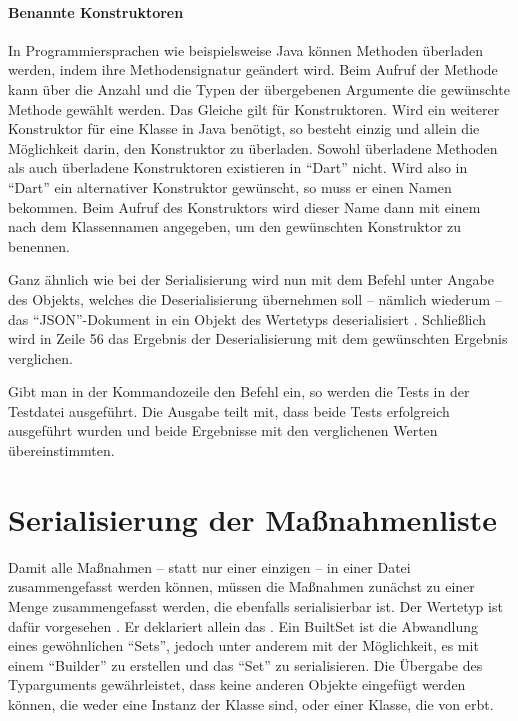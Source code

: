\paragraph{Benannte Konstruktoren} In Programmiersprachen wie beispielsweise Java können Methoden überladen werden, indem ihre Methodensignatur geändert wird.
Beim Aufruf der Methode kann über die Anzahl und die Typen der übergebenen Argumente die gewünschte Methode gewählt werden.
Das Gleiche gilt für Konstruktoren.
Wird ein weiterer Konstruktor für eine Klasse in Java benötigt, so besteht einzig und allein die Möglichkeit darin, den Konstruktor zu überladen.
Sowohl überladene Methoden als auch überladene Konstruktoren existieren in \enquote{Dart} nicht.
Wird also in \enquote{Dart} ein alternativer Konstruktor gewünscht, so muss er einen Namen bekommen.
Beim Aufruf des Konstruktors wird dieser Name dann mit einem  nach dem Klassennamen angegeben, um den gewünschten Konstruktor zu benennen.


Ganz ähnlich wie bei der Serialisierung wird nun mit dem Befehl    unter Angabe des Objekts,
welches die Deserialisierung übernehmen soll -- nämlich wiederum  -- das \enquote{JSON}-Dokument in ein Objekt des Wertetyps  deserialisiert .
Schließlich wird in Zeile 56 das Ergebnis der Deserialisierung mit dem gewünschten Ergebnis verglichen.



Gibt man in der Kommandozeile den Befehl    ein,
so werden die Tests in der Testdatei ausgeführt.
Die Ausgabe  teilt mit,
dass beide Tests erfolgreich ausgeführt wurden und beide Ergebnisse mit den verglichenen Werten übereinstimmten.

\section{Serialisierung der Maßnahmenliste}

Damit alle Maßnahmen -- statt nur einer einzigen -- in einer Datei zusammengefasst werden können, müssen die Maßnahmen zunächst zu einer Menge zusammengefasst werden, die ebenfalls serialisierbar ist.
Der Wertetyp  ist dafür vorgesehen \Lst{\ref{lst:Schritt1WerteTypStorage}}.
Er deklariert allein das  .
Ein BuiltSet ist die Abwandlung eines gewöhnlichen \enquote{Sets}, jedoch unter anderem mit der Möglichkeit, es mit einem \enquote{Builder} zu erstellen und das \enquote{Set} zu serialisieren.
Die Übergabe des Typarguments  gewährleistet, dass keine anderen Objekte eingefügt werden können, die weder eine Instanz der Klasse  sind, oder einer Klasse, die von  erbt.

